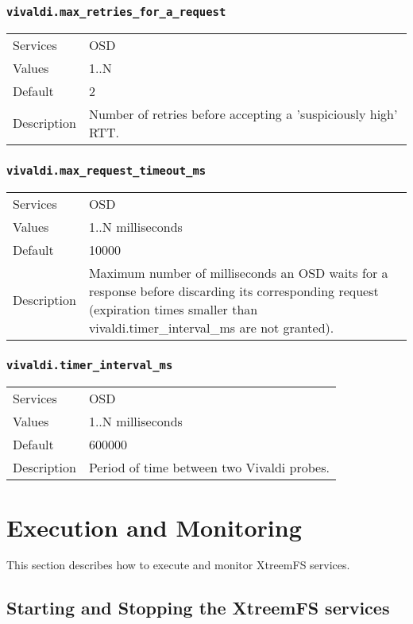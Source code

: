 \documentclass[a4paper,10pt]{book}
\begin{document}
\subsubsection{\texttt{vivaldi.max\_retries\_for\_a\_request}}
\begin{tabular}{lp{10cm}}
 Services & OSD \\
 Values   & 1..N \\
 Default  & 2 \\
 Description & Number of retries before accepting a 'suspiciously high' RTT.
\end{tabular}

\subsubsection{\texttt{vivaldi.max\_request\_timeout\_ms}}
\begin{tabular}{lp{10cm}}
 Services & OSD\\
 Values   & 1..N milliseconds \\
 Default  & 10000 \\
 Description & Maximum number of milliseconds an OSD waits for a response before discarding its corresponding request (expiration times smaller than vivaldi.timer\_interval\_ms are not granted).
\end{tabular}

\subsubsection{\texttt{vivaldi.timer\_interval\_ms}}
\begin{tabular}{lp{10cm}}
 Services & OSD\\
 Values   & 1..N milliseconds \\
 Default  & 600000 \\
 Description & Period of time between two Vivaldi probes.
\end{tabular}

\section{Execution and Monitoring}
This section describes how to execute and monitor XtreemFS services.

\subsection{Starting and Stopping the XtreemFS services}
\label{sec:startstopservice}
\end{document}
